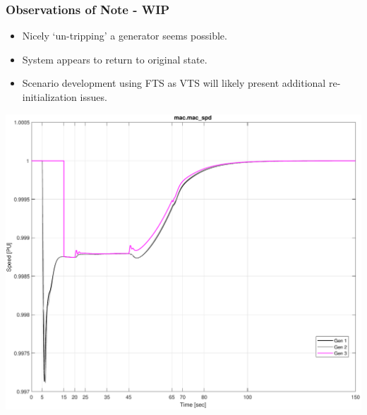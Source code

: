 \subsubsection{Observations of Note - WIP}
\begin{itemize}
 em
\singlespacing
\item Nicely `un-tripping' a generator seems possible.
\item System appears to return to original state.
\item Scenario development using FTS as VTS will likely present additional re-initialization issues.
\end{itemize}

\includegraphics[width=\linewidth]{examples/untrip/combinedSpeed}

